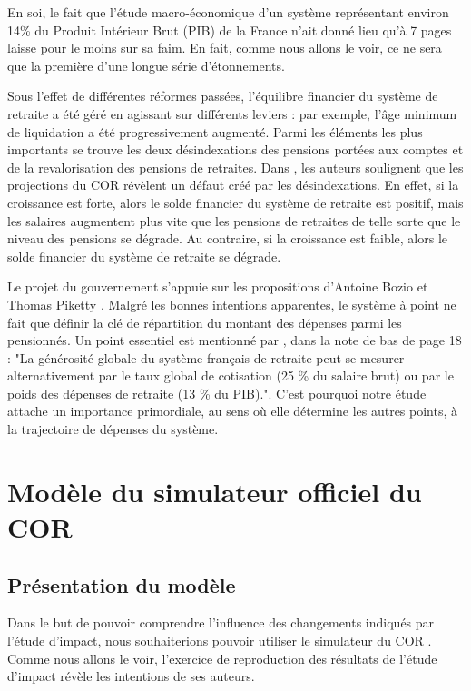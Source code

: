 \documentclass[10pt]{article}
\begin{document}
En soi, le fait que l'étude macro-économique d'un système représentant environ 14\% 
du Produit Intérieur Brut (PIB) de la France n'ait donné lieu qu'à 7 pages laisse pour le 
moins sur sa faim. 
En fait, comme nous allons le voir, ce ne sera que la première d'une longue 
série d'étonnements. 

Sous l'effet de différentes réformes passées, l'équilibre financier du système 
de retraite a été géré en agissant sur différents 
leviers : par exemple, l'âge minimum de liquidation a été progressivement augmenté. 
Parmi les éléments les plus importants se trouve les deux désindexations 
des pensions portées aux comptes et de la revalorisation des pensions de retraites. 
Dans \cite{Gannon2019}, les auteurs soulignent que les 
projections du COR révèlent un défaut créé par les désindexations. 
En effet, si la croissance est forte, alors le solde financier 
du système de retraite est positif, mais les salaires augmentent plus vite que 
les pensions de retraites de telle sorte que le niveau des pensions se dégrade. 
Au contraire, si la croissance est faible, alors le solde financier du système 
de retraite se dégrade. 

Le projet du gouvernement s'appuie sur les propositions d'Antoine 
Bozio et Thomas Piketty \cite{Bozio2008}. 
Malgré les bonnes intentions apparentes, le système à point ne fait que 
définir la clé de répartition du montant des dépenses parmi les pensionnés. 
Un point essentiel est mentionné par \cite{Bozio2008}, dans la note de 
bas de page 18 : "La générosité globale du système français de retraite 
peut se mesurer alternativement par le taux global de cotisation (25 \% du salaire brut) 
ou par le poids des dépenses de retraite (13 \% du PIB).". 
C'est pourquoi notre étude attache un importance primordiale, au sens où elle 
détermine les autres points, à la trajectoire de dépenses du système. 


\section{Modèle du simulateur officiel du COR}

\subsection{Présentation du modèle}

Dans le but de pouvoir comprendre l'influence des changements indiqués par 
l'étude d'impact, nous souhaiterions pouvoir utiliser le simulateur du COR 
\cite{SimulateurCOR}. 
Comme nous allons le voir, l'exercice de reproduction des résultats 
de l'étude d'impact révèle les intentions de ses auteurs. 
\end{document}
